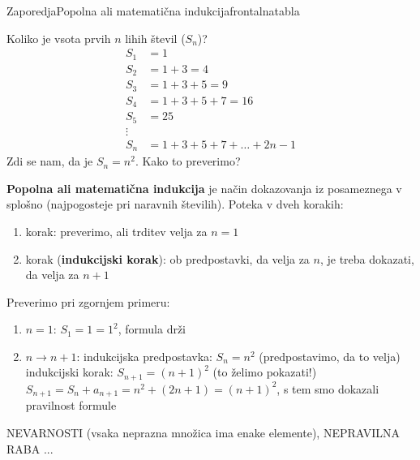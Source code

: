 \begin{priprava}{}{}{Zaporedja}{Popolna ali matematična indukcija}{frontalna}{tabla}

Koliko je vsota prvih $ n $ lihih števil ($ S_n $)?
\begin{equation*}
    \begin{split}
S_1 & = 1 \\
S_2 & = 1 + 3 = 4 \\
S_3 & = 1 + 3 + 5 = 9 \\
S_4 & = 1 + 3 + 5 + 7 = 16 \\
S_5 & = 25 \\
\vdots \\
S_n & = 1 + 3 + 5 + 7 + \ldots + 2n - 1
    \end{split}
\end{equation*}
Zdi se nam, da je $ S_n = n^2 $. Kako to preverimo?

\textbf{Popolna ali matematična indukcija} je način dokazovanja iz posameznega v splošno (najpogosteje pri naravnih številih). Poteka v dveh korakih:
\begin{enumerate}
    \item korak: preverimo, ali trditev velja za $ n = 1 $
    \item korak (\textbf{indukcijski korak}): ob predpostavki, da velja za $ n $, je treba dokazati, da velja za $ n + 1 $
\end{enumerate}

Preverimo pri zgornjem primeru:
\begin{enumerate}
    \item $ n = 1 $: $ S_1 = 1 = 1^2 $, formula drži
    \item $ n \rightarrow n + 1 $:
        \subitem indukcijska predpostavka: $ S_n = n^2 $ (predpostavimo, da to velja)
        \subitem indukcijski korak: $ S_{n+1} = (n+1)^2 $ (to želimo pokazati!)
        \subitem $ S_{n+1} = S_n + a_{n+1} = n^2 + (2n + 1) = (n + 1)^2 $, s tem smo dokazali pravilnost formule
\end{enumerate}


NEVARNOSTI (vsaka neprazna množica ima enake elemente), NEPRAVILNA RABA ...

\end{priprava}